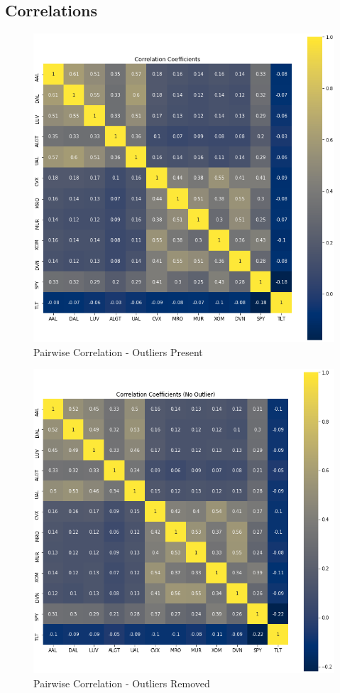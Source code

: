\documentclass{article}
\begin{document}
\newpage
\subsection{Correlations}
\begin{figure}[h!]
  \centering
    \includegraphics[width=.5\linewidth]{../Figures/pair_corr_out.png}
    \caption{Pairwise Correlation - Outliers Present}
\end{figure}
\begin{figure}[h!]
  \centering
    \includegraphics[width=.5\linewidth]{../Figures/pair_corr_no_out.png}
    \caption{Pairwise Correlation - Outliers Removed}
\end{figure}

\newpage
\end{document}
